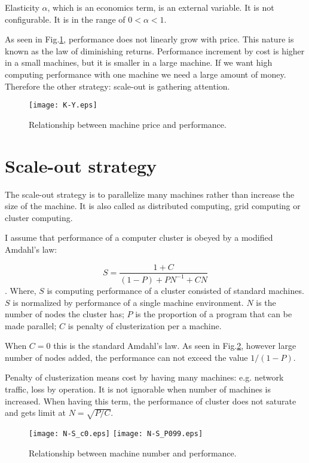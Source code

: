 \documentclass[a4paper,11pt]{article}
\begin{document}
Elasticity $\alpha$, which is an economics term, is an external variable.
It is not configurable. It is in the range of $0 < \alpha < 1$.

As seen in Fig.\ref{K-Y}, performance does not linearly grow with price.
This nature is known as the law of diminishing returns.
Performance increment by cost is higher in a small machines,
but it is smaller in a large machine.
If we want high computing performance with one machine we need a large amount of money.
Therefore the other strategy: scale-out is gathering attention.

\begin{figure}
\begin{center}
\texttt{[image: K-Y.eps]}
\caption{Relationship between machine price and performance.}
\label{K-Y}
\end{center}
\end{figure}

\section{Scale-out strategy}

The scale-out strategy is to parallelize many machines rather than increase the size of the machine. It is also called as distributed computing, grid computing or cluster computing.

I assume that performance of a computer cluster is obeyed by a modified Amdahl's law:

$$
S = \frac{1 + C}{(1-P) + P N^{-1} + C N}
$$
. 
Where, 
$S$ is computing performance of a cluster consisted of standard machines.
$S$ is normalized by performance of a single machine environment.
$N$ is the number of nodes the cluster has;
$P$ is the proportion of a program that can be made parallel;
$C$ is penalty of clusterization per a machine.

When $C=0$ this is the standard Amdahl's law. As seen in Fig.\ref{N-S}, however large number of nodes added, the performance can not exceed the value $1/(1-P)$.

Penalty of clusterization means cost by having many machines: e.g. network traffic, loss by operation. It is not ignorable when number of machines is increased.
When having this term, the performance of cluster does not saturate and gets limit at $N = \sqrt{P/C}$.

\begin{figure}
\begin{center}
\texttt{[image: N-S\_c0.eps]}
\texttt{[image: N-S\_P099.eps]}
\caption{Relationship between machine number and performance.}
\label{N-S}
\end{center}
\end{figure}
\end{document}
